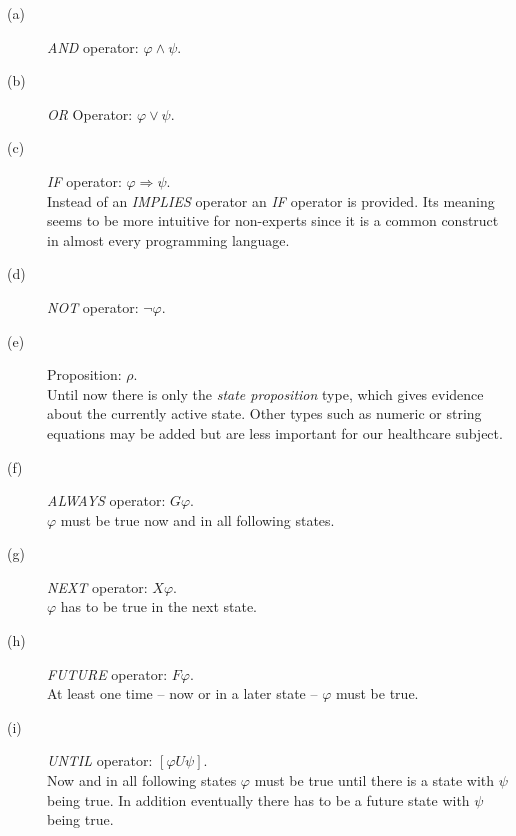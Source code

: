 \documentclass[conference]{IEEEtran}
\begin{document}
\begin{description}
	\item[(a)] \emph{AND} operator: $\varphi \wedge \psi$.
	\item[(b)] \emph{OR} Operator: $\varphi \vee \psi$.
	\item[(c)] \emph{IF} operator: $\varphi \Rightarrow \psi$.\\Instead of an \emph{IMPLIES} operator an \emph{IF} operator is provided. Its meaning seems to be more intuitive for non-experts since it is a common construct in almost every programming language.
	\item[(d)] \emph{NOT} operator: $\neg \varphi$.
	\item[(e)] Proposition: $\rho$.\\Until now there is only the \emph{state proposition} type, which gives evidence about the currently active state. Other types such as numeric or string equations may be added but are less important for our healthcare subject.
	\item[(f)] \emph{ALWAYS} operator: $G \varphi$.\\$\varphi$ must be true now and in all following states.
	\item[(g)] \emph{NEXT} operator: $X \varphi$.\\$\varphi$ has to be true in the next state.
	\item[(h)] \emph{FUTURE} operator: $F \varphi$.\\At least one time -- now or in a later state -- $\varphi$ must be true.
	\item[(i)] \emph{UNTIL} operator: $[\varphi U \psi]$.\\Now and in all following states $\varphi$ must be true until there is a state with $\psi$ being true. In addition eventually there has to be a future state with $\psi$ being true.
\end{description}
\end{document}
